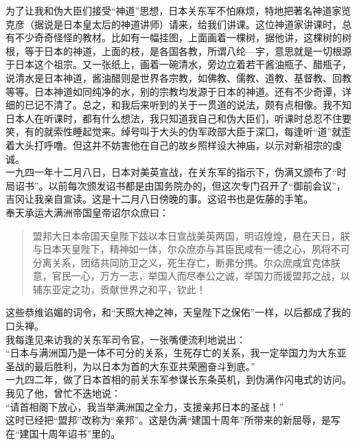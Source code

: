 为了让我和伪大臣们接受“神道”思想，日本关东军不怕麻烦，特地把著名神道家览克彦（据说是日本皇太后的神道讲师）请来，给我们讲课。这位神道家讲课时，总有不少奇奇怪怪的教材。比如有一幅挂图，上面画着一棵树，据他讲，这棵树的树根，等于日本的神道，上面的枝，是各国各教，所谓八纶—宇，意思就是一切根源于日本这个祖宗。又一张纸上，画着一碗清水，旁边立着若干酱油瓶子、醋瓶子，说清水是日本神道，酱油醋则是世界各宗教，如佛教、儒教、道教、基督教、回教等等。日本神道如同纯净的水，别的宗教均发源于日本的神道。还有不少奇谭，详细的已记不清了。总之，和我后来听到的关于一贯道的说法，颇有点相像。我不知日本人在听课时，都有什么想法，我只知道我自己和伪大臣们，听课时总忍不住要笑，有的就索性睡起觉来。绰号叫于大头的伪军政部大臣于深囗，每逢听“道”就歪着大头打呼噜。但这并不妨害他在自己的故乡照样设大神庙，以示对新祖宗的虔诚。\\

一九四一年十二月八日，日本对美英宣战，在关东军的指示下，伪满又颁布了“时局诏书”。以前每次颁发诏书都是由国务院办的，但这次专门召开了“御前会议”，吉冈让我亲自宣读。这是十二月八日傍晚的事。这诏书也是佐藤的手笔。\\

奉天承运大满洲帝国皇帝诏尔众庶曰：\\

\begin{quote}
	盟邦大日本帝国天皇陛下兹以本日宣战美英两国，明诏煌煌，悬在天日，朕与日本天皇陛下，精神如一体，尔众庶亦与其臣民咸有一德之心，夙将不可分离关系，团结共同防卫之义，死生存亡，断弗分携。尔众庶咸宜克体朕意，官民一心，万方一志，举国人而尽奉公之诚，举国力而援盟邦之战，以辅东亚定之功，贡献世界之和平，钦此！
\end{quote}

这些恭维谄媚的词令，和“天照大神之神，天皇陛下之保佑”一样，以后都成了我的口头禅。\\

我每逢见来访我的关东军司令官，一张嘴便流利地说出：\\

“日本与满洲国乃是一体不可分的关系，生死存亡的关系，我一定举国力为大东亚圣战的最后胜利，为以日本为首的大东亚共荣圈奋斗到底。”\\

一九四二年，做了日本首相的前关东军参谋长东条英机，到伪满作闪电式的访问。我见了他，曾忙不迭地说：\\

“请首相阁下放心，我当举满洲国之全力，支援亲邦日本的圣战！”\\

这时已经把“盟邦”改称为“亲邦”。这是伪满“建国十周年”所带来的新屈辱，是写在“建国十周年诏书”里的。\\

